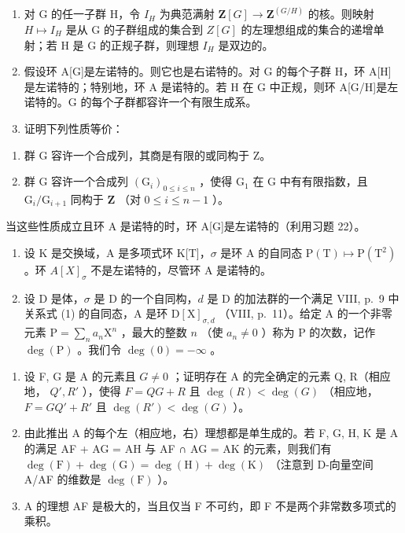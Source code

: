 \begin{enumerate}
\def\labelenumi{\alph{enumi})}
\item
  对 G 的任一子群 H，令 \(I_{H}\) 为典范满射 \(\mathbf{Z}[G] \to \mathbf{Z}^{(G/H)}\) 的核。则映射 \(H \mapsto I_{H}\) 是从 G 的子群组成的集合到 \(Z[G]\) 的左理想组成的集合的递增单射；若 H 是 G 的正规子群，则理想 \(I_{H}\) 是双边的。
\item
  假设环 A{[}G{]}是左诺特的。则它也是右诺特的。对 G 的每个子群 H，环 A{[}H{]}是左诺特的；特别地，环 A 是诺特的。若 H 在 G 中正规，则环 A{[}G/H{]}是左诺特的。G 的每个子群都容许一个有限生成系。
\item
  证明下列性质等价：
\end{enumerate}

\begin{enumerate}
\def\labelenumi{(\roman{enumi})}
\item
  群 G 容许一个合成列，其商是有限的或同构于 Z。
\item
  群 G 容许一个合成列 \((\mathrm{G}_i)_{0\leqslant i\leqslant n}\) ，使得 \(\mathrm{G}_1\) 在 G 中有有限指数，且 \(\mathrm{G}_i / \mathrm{G}_{i + 1}\) 同构于 \(\mathbf{Z}\) （对 \(0\leqslant i\leqslant n - 1\) ）。
\end{enumerate}

当这些性质成立且环 A 是诺特的时，环 A{[}G{]}是左诺特的（利用习题 22）。

\begin{enumerate}
\def\labelenumi{\arabic{enumi})}
\setcounter{enumi}{25}
\item
  设 K 是交换域，A 是多项式环 K{[}T{]}，\(\sigma\) 是环 A 的自同态 \(\mathrm{P(T)}\mapsto\mathrm{P(T^{2})}\) 。环 \(A[X]_{\sigma}\) 不是左诺特的，尽管环 A 是诺特的。
\item
  设 D 是体，\(\sigma\) 是 D 的一个自同构，\(d\) 是 D 的加法群的一个满足 VIII, p.~9 中关系式 (1) 的自同态，A 是环 \(\mathrm{D}[\mathrm{X}]_{\sigma,d}\) （VIII, p.~11）。给定 A 的一个非零元素 \(\mathrm{P} = \sum_{n}a_{n}\mathrm{X}^{n}\) ，最大的整数 \(n\) （使 \(a_{n}\neq 0\) ）称为 P 的次数，记作 \(\deg (\mathrm{P})\) 。我们令 \(\deg (0) = -\infty\) 。
\end{enumerate}

\begin{enumerate}
\def\labelenumi{\alph{enumi})}
\item
  设 F, G 是 A 的元素且 \(G \neq 0\) ；证明存在 A 的完全确定的元素 Q, R（相应地， \(Q', R'\) ），使得 \(F = QG + R\) 且 \(\deg(R) < \deg(G)\) （相应地， \(F = GQ' + R'\) 且 \(\deg(R') < \deg(G)\) ）。
\item
  由此推出 A 的每个左（相应地，右）理想都是单生成的。若 F, G, H, K 是 A 的满足 AF + AG = AH 与 AF ∩ AG = AK 的元素，则我们有 \(\deg(\mathrm{F}) + \deg(\mathrm{G}) = \deg(\mathrm{H}) + \deg(\mathrm{K})\) （注意到 D-向量空间 A/AF 的维数是 \(\deg(\mathrm{F})\) ）。
\item
  A 的理想 AF 是极大的，当且仅当 F 不可约，即 F 不是两个非常数多项式的乘积。
\end{enumerate}

